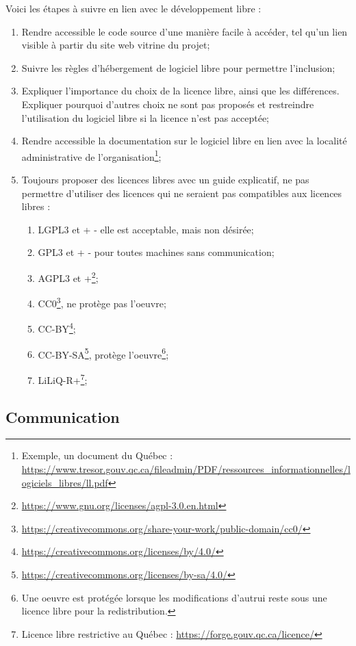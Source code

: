 Voici les étapes à suivre en lien avec le développement libre :
\begin{enumerate}
    \item Rendre accessible le code source d'une manière facile à accéder, tel qu'un lien visible à partir du site web vitrine du projet;
    \item Suivre les règles d'hébergement de logiciel libre pour permettre l'inclusion;
    \item Expliquer l'importance du choix de la licence libre, ainsi que les différences. Expliquer pourquoi d'autres choix ne sont pas proposés et restreindre l'utilisation du logiciel libre si la licence n'est pas acceptée;
    \item Rendre accessible la documentation sur le logiciel libre en lien avec la localité administrative de l'organisation\footnote{Exemple, un document du Québec : \url{https://www.tresor.gouv.qc.ca/fileadmin/PDF/ressources_informationnelles/logiciels_libres/ll.pdf}};
    \item Toujours proposer des licences libres avec un guide explicatif, ne pas permettre d'utiliser des licences qui ne seraient pas compatibles aux licences libres :
    \begin{enumerate}
        \item LGPL3 et + - elle est acceptable, mais non désirée;
        \item GPL3 et + - pour toutes machines sans communication;
        \item AGPL3 et +\footnote{\url{https://www.gnu.org/licenses/agpl-3.0.en.html}};
        \item CC0\footnote{\url{https://creativecommons.org/share-your-work/public-domain/cc0/}}, ne protège pas l'oeuvre;
        \item CC-BY\footnote{\url{https://creativecommons.org/licenses/by/4.0/}};
        \item CC-BY-SA\footnote{\url{https://creativecommons.org/licenses/by-sa/4.0/}}, protège l'oeuvre\footnote{Une oeuvre est protégée lorsque les modifications d'autrui reste sous une licence libre pour la redistribution.};
        \item LiLiQ-R+\footnote{Licence libre restrictive au Québec : \url{https://forge.gouv.qc.ca/licence/}};
    \end{enumerate}
\end{enumerate}

\subsection{Communication}

